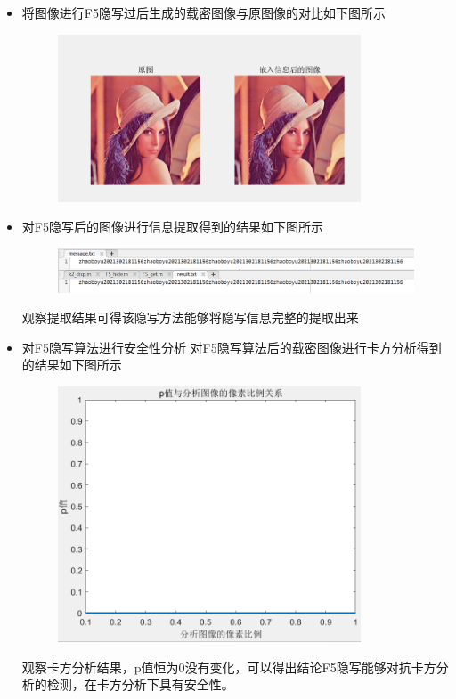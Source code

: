 \documentclass[a4paper,11pt,UTF8]{ctexart}
\newcommand{\bottomcaption}{%
\setlength{\abovecaptionskip}{6pt}%
\setlength{\belowcaptionskip}{6pt}%
\caption}
\newcommand{\xiaowuhao}{\fontsize{9pt}{\baselineskip}\selectfont}   %
\begin{document}
    \begin{itemize}
      \item 将图像进行F5隐写过后生成的载密图像与原图像的对比如下图所示
        \begin{figure}[H]
          \centering
          \includegraphics[width=9cm]{F5_image_compare.png}
          \bottomcaption{\xiaowuhao{对F5隐写后的原图与载密图像的对比}}
        \end{figure}

      \item 对F5隐写后的图像进行信息提取得到的结果如下图所示
        \begin{figure}[H]
          \centering
          \includegraphics[width=11cm]{F5_get.png}
          \bottomcaption{\xiaowuhao{提取F5隐写后的图像的结果}}
        \end{figure}
        观察提取结果可得该隐写方法能够将隐写信息完整的提取出来

      \item 对F5隐写算法进行安全性分析
        对F5隐写算法后的载密图像进行卡方分析得到的结果如下图所示
        \begin{figure}[H]
          \centering
          \includegraphics[width=9cm]{k2_F5.png}
          \bottomcaption{\xiaowuhao{F5隐写后的载密图像进行卡方分析}}
        \end{figure}
        观察卡方分析结果，p值恒为0没有变化，可以得出结论F5隐写能够对抗卡方分析的检测，在卡方分析下具有安全性。



\end{itemize}
\end{document}
